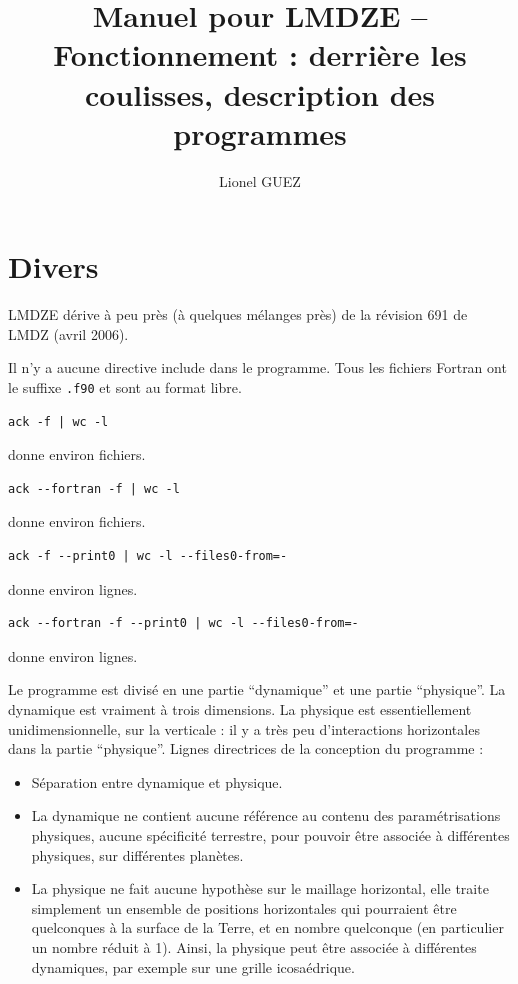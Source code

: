 \documentclass[a4paper,english,french]{article}
\author{Lionel GUEZ}
\title{Manuel pour LMDZE -- Fonctionnement : derrière les coulisses,
  description des programmes}
\begin{document}
\maketitle
\tableofcontents
\listoffigures

\section{Divers}

LMDZE dérive à peu près (à quelques mélanges près) de la révision 691
de LMDZ (avril 2006).

Il n'y a aucune directive include dans le programme. Tous les fichiers
Fortran ont le suffixe \verb+.f90+ et sont au format libre.
\begin{verbatim}
ack -f | wc -l
\end{verbatim}
donne environ  fichiers.
\begin{verbatim}
ack --fortran -f | wc -l
\end{verbatim}
donne environ  fichiers.
\begin{verbatim}
ack -f --print0 | wc -l --files0-from=-
\end{verbatim}
donne environ  lignes.
\begin{verbatim}
ack --fortran -f --print0 | wc -l --files0-from=-
\end{verbatim}
donne environ  lignes.

Le programme est divisé en une partie ``dynamique'' et une partie
``physique''. La dynamique est vraiment à trois dimensions.  La
physique est essentiellement unidimensionnelle, sur la verticale : il
y a très peu d'interactions horizontales dans la partie ``physique''.
Lignes directrices de la conception du programme :
\begin{itemize}
\item Séparation entre dynamique et physique.
\item La dynamique ne contient aucune référence au contenu des
  paramétrisations physiques, aucune spécificité terrestre, pour
  pouvoir être associée à différentes physiques, sur différentes
  planètes.
\item La physique ne fait aucune hypothèse sur le maillage horizontal,
  elle traite simplement un ensemble de positions horizontales qui
  pourraient être quelconques à la surface de la Terre, et en nombre
  quelconque (en particulier un nombre réduit à 1). Ainsi, la physique
  peut être associée à différentes dynamiques, par exemple sur une
  grille icosaédrique.
\end{itemize}
\end{document}
